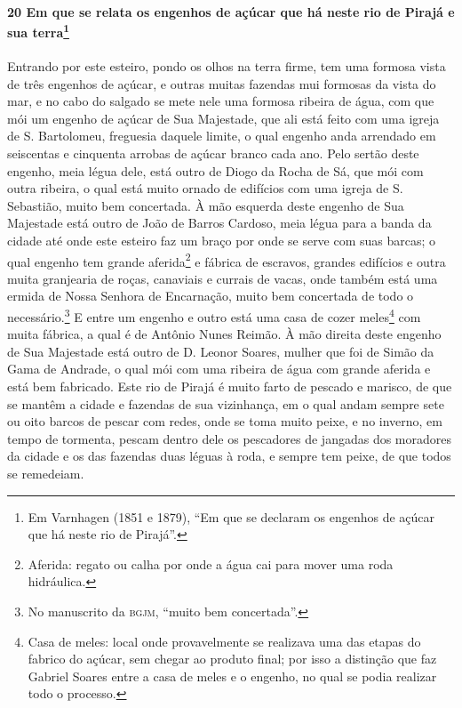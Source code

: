 \begin{linenumbers}
\paragraph{20 Em que se relata os engenhos de açúcar que há neste rio de Pirajá e sua
terra\protect\footnote{ Em Varnhagen (1851 e 1879), ``Em que se declaram os engenhos de
açúcar que há neste rio de Pirajá''.}}\quad
Entrando por este esteiro, pondo os olhos na terra firme, tem uma formosa vista de três
engenhos de açúcar, e outras muitas fazendas mui formosas da vista do mar, e no cabo do
salgado se mete nele uma formosa ribeira de água, com que mói um engenho de açúcar de Sua
Majestade, que ali está feito com uma igreja de S. Bartolomeu, freguesia daquele limite, o
qual engenho anda arrendado em seiscentas e cinquenta arrobas de açúcar branco cada ano.
Pelo sertão deste engenho, meia légua dele, está outro de Diogo da Rocha de Sá, que mói
com outra ribeira, o qual está muito ornado de edifícios com uma igreja de S. Sebastião,
muito bem concertada. À mão esquerda deste engenho de Sua Majestade está outro de João de
Barros Cardoso, meia légua para a banda da cidade até onde este esteiro faz um braço por
onde se serve com suas barcas; o qual engenho tem grande aferida\footnote{ Aferida: regato
ou calha por onde a água cai para mover uma roda hidráulica.} e fábrica de escravos,
grandes edifícios e outra muita granjearia de roças, canaviais e currais de vacas, onde
também está uma ermida de Nossa Senhora de Encarnação, muito bem concertada de todo o
necessário.\footnote{ No manuscrito da \textsc{bgjm}, ``muito bem concertada''.} E entre
um engenho e outro está uma casa de cozer meles\footnote{ Casa de meles: local onde
provavelmente se realizava uma das etapas do fabrico do açúcar, sem chegar ao produto
final; por isso a distinção que faz Gabriel Soares entre a casa de meles e o engenho, no
qual se podia realizar todo o processo.} com muita fábrica, a qual é de Antônio Nunes
Reimão. À mão direita deste engenho de Sua Majestade está outro de D. Leonor Soares,
mulher que foi de Simão da Gama de Andrade, o qual mói com uma ribeira de água com grande
aferida e está bem fabricado. Este rio de Pirajá é muito farto de pescado e marisco, de
que se mantêm a cidade e fazendas de sua vizinhança, em o qual andam sempre sete ou oito
barcos de pescar com redes, onde se toma muito peixe, e no inverno, em tempo de tormenta,
pescam dentro dele os pescadores de jangadas dos moradores da cidade e os das fazendas
duas léguas à roda, e sempre tem peixe, de que todos se remedeiam.


\end{linenumbers}
